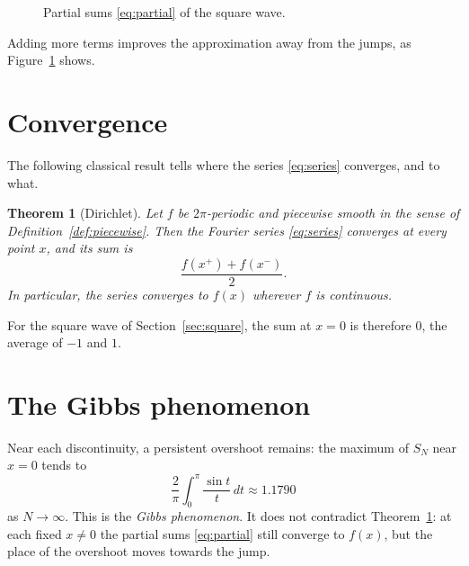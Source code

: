 \documentclass[11pt,a4paper]{article}
\newtheorem{theorem}{Theorem}
\theoremstyle{definition}
\begin{document}
\begin{figure}[ht]
\centering
{}
\caption{Partial sums \eqref{eq:partial} of the square wave.}\label{fig:square}
\end{figure}

Adding more terms improves the approximation away from the jumps,
as Figure~\ref{fig:square} shows.

\clearpage
\section{Convergence}\label{sec:convergence}
The following classical result tells where the series
\eqref{eq:series} converges, and to what.

\begin{theorem}[Dirichlet]\label{thm:dirichlet}
Let $f$ be $2\pi$-periodic and piecewise smooth in the sense of
Definition~\ref{def:piecewise}. Then the Fourier series
\eqref{eq:series} converges at every point $x$, and its sum is
\[
  \frac{f(x^{+})+f(x^{-})}{2}.
\]
In particular, the series converges to $f(x)$ wherever $f$ is continuous.
\end{theorem}

For the square wave of Section~\ref{sec:square}, the sum at $x=0$
is therefore $0$, the average of $-1$ and $1$.

\section{The Gibbs phenomenon}\label{sec:gibbs}
Near each discontinuity, a persistent overshoot remains:
the maximum of $S_N$ near $x=0$ tends to
\begin{equation}\label{eq:gibbs}
  \frac{2}{\pi}\int_0^{\pi}\frac{\sin t}{t}\,dt \approx 1.1790
\end{equation}
as $N\to\infty$. This is the \emph{Gibbs phenomenon}. It does not
contradict Theorem~\ref{thm:dirichlet}: at each fixed $x\neq0$ the
partial sums \eqref{eq:partial} still converge to $f(x)$, but the
place of the overshoot moves towards the jump.
\end{document}

